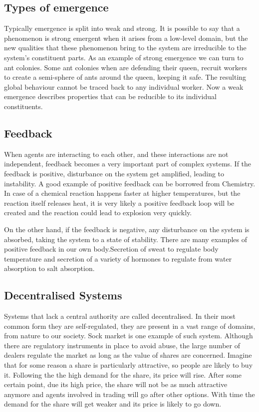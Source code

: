 \subsection{Types of emergence}

Typically emergence is split into weak and strong. It is possible to say that a phenomenon is strong emergent when it arises from a low-level domain, but the new qualities that these phenomenon bring to the system are irreducible to the system's constituent parts.\cite{laughlin2008different} As an example of strong emergence we can turn to ant colonies. Some ant colonies when are defending their queen, recruit workers to create a semi-sphere of ants around the queen, keeping it safe. The resulting global behaviour cannot be traced back to any individual worker. Now a weak emergence describes properties that can be reducible to its individual constituents. 

\subsection{Feedback}
\label{subsec:feedback}

When agents are interacting to each other, and these interactions are not independent, feedback becomes a very important part of complex systems. If the feedback is positive, disturbance on the system get amplified, leading to instability. A good example of positive feedback can be borrowed from Chemistry. In case of a chemical reaction happens faster at higher temperatures, but the reaction itself releases heat, it is very likely a positive feedback loop will be created and the reaction could lead to explosion very quickly.

On the other hand, if the feedback is negative, any disturbance on the system is absorbed, taking the system to a state of stability. There are many examples of positive feedback in our own body.Secretion of sweat to regulate body temperature and secretion of a variety of hormones to regulate from water absorption to salt absorption.  

\subsection{Decentralised Systems}

Systems that lack a central authority are called decentralised. In their most common form they are self-regulated, they are present in a vast range of domains, from nature to our society. Sock market is one example of such system. Although there are regulatory instruments in place to avoid abuse, the large number of dealers regulate the market as long as the value of shares are concerned. Imagine that for some reason a share is particularly attractive, so people are likely to buy it. Following the the high demand for the share, its price will rise. After some certain point, due its high price, the share will not be as much attractive anymore and agents involved in trading will go after other options. With time the demand for the share will get weaker and its price is likely to go down.

